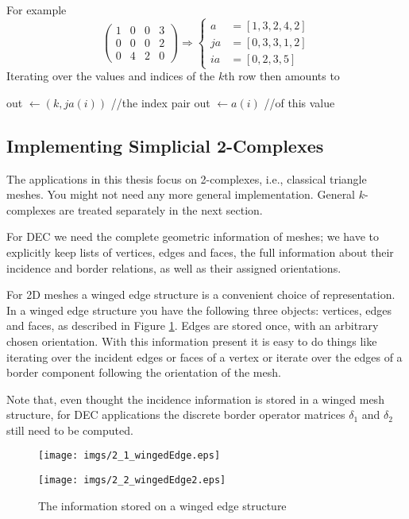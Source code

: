 For example 
\[\begin{pmatrix}
1 & 0 & 0 &3 \\
 0 & 0 & 0 &2 \\
 0 & 4&2&0
\end{pmatrix} \Rightarrow \begin{cases} a &= [1,3,2,4,2]\\ ja &= [0,3,3,1,2] \\ ia &= [0,2,3,5]  \end{cases}\]
Iterating over the values and indices of the $k$th row then amounts to
\begin{algorithmic}
	\STATE out $\gets (k,ja(i))$   //the index pair
	\STATE out $\gets a(i)$  //of this value
\ENDFOR
\end{algorithmic}

\subsection{Implementing Simplicial 2-Complexes}
\label{sec::2_handsOnSimplicialComplexes}
The applications in this thesis focus on 2-complexes, i.e., classical triangle meshes. You might not need any more general implementation. General $k$-complexes are treated separately in the next section. 

For DEC we need the complete geometric information of meshes; we have to explicitly keep lists of vertices, edges and faces, the full information about their incidence and border relations, as well as their assigned orientations. 

For 2D meshes a winged edge structure is a convenient choice of representation. In a winged edge structure you have the following three objects: vertices, edges and faces, as described in Figure \ref{figs::2_1_wingedEdge}. Edges are stored once, with an arbitrary chosen orientation. With this information present it is easy to do things like iterating over the incident edges or faces of a vertex or iterate over the edges of a border component following the orientation of the mesh.

Note that, even thought the incidence information is stored in a winged mesh structure, for DEC applications the discrete border operator matrices $\delta_1$ and $\delta_2$ still need to be computed.

\begin{figure}[tb]
\begin{center}
\texttt{[image: imgs/2\_1\_wingedEdge.eps]}%
\vspace{0.5cm}

\texttt{[image: imgs/2\_2\_wingedEdge2.eps]}
\end{center}
\caption{The information stored on a winged edge structure}%
\label{figs::2_1_wingedEdge}%
\end{figure}

